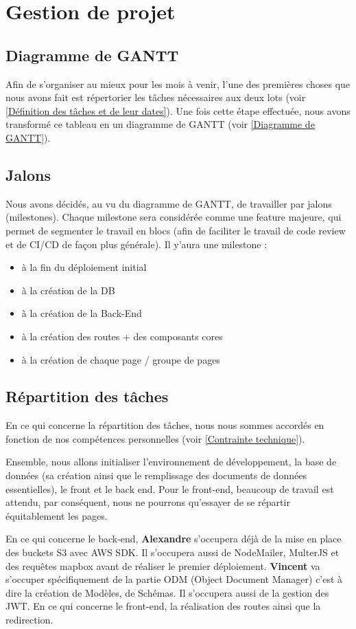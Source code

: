 \section{Gestion de projet}


\subsection{Diagramme de GANTT}

Afin de s'organiser au mieux pour les mois à venir, l'une des premières choses que nous avons fait est répertorier les tâches nécessaires aux deux lots (voir \ref{Définition des tâches et de leur dates}).
Une fois cette étape effectuée, nous avons transformé ce tableau en un diagramme de GANTT (voir \ref{Diagramme de GANTT}).

\subsection{Jalons}

Nous avons décidés, au vu du diagramme de GANTT, de travailler par jalons (milestones). Chaque milestone sera considérée comme une feature majeure, qui permet de segmenter le travail en blocs (afin de faciliter le travail de code review et de CI/CD de façon plus générale). 
Il y'aura une milestone :

\begin{itemize}
    \item à la fin du déploiement initial
    \item à la création de la DB
    \item à la création de la Back-End
    \item à la création des routes + des composants cores
    \item à la création de chaque page / groupe de pages
\end{itemize}


\subsection{Répartition des tâches}
En ce qui concerne la répartition des tâches, nous nous sommes accordés en fonction de nos compétences personnelles (voir \ref{Contrainte technique}).

Ensemble, nous allons initialiser l'environnement de développement, la base de données (sa création ainsi que le remplissage des documents de données essentielles), le front et le back end. 
Pour le front-end, beaucoup de travail est attendu, par conséquent, nous ne pourrons qu'essayer de se répartir équitablement les pages.

En ce qui concerne le back-end,
\textbf{Alexandre} s'occupera déjà de la mise en place des buckets S3 avec AWS SDK. Il s'occupera aussi de NodeMailer, MulterJS et des requêtes mapbox avant de réaliser le premier déploiement. \textbf{Vincent} va s'occuper spécifiquement de la partie ODM (Object Document Manager) c'est à dire la création de Modèles, de Schémas. Il s'occupera aussi de la gestion des JWT.
En ce qui concerne le front-end, la réalisation des routes ainsi que la redirection.

